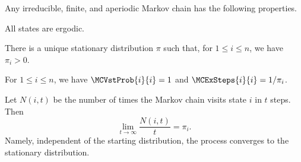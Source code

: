 \begin{theorem}
        \hfill\break Any irreducible, finite, and aperiodic Markov chain has
        the following properties.
        \begin{compactenumi}
            \item All states are ergodic.
            
            \item There is a unique stationary distribution $\pi$ such
            that, for $1 \leq i \leq n$, we have $\pi_i > 0$.
            
            \item For $1 \leq i \leq n$, we have $\MCVstProb{i}{i} =1$
            and $\MCExSteps{i}{i} = 1/ \pi_i$.
            
            \item Let $N(i,t)$ be the number of times the Markov chain
            visits state $i$ in $t$ steps. Then
            \begin{equation*}
                \lim_{t \rightarrow \infty} \frac{N(i,t)}{t} = \pi_i.
            \end{equation*}
            Namely, independent of the starting distribution, the
            process converges to the stationary distribution.
        \end{compactenumi}
    \end{theorem}
